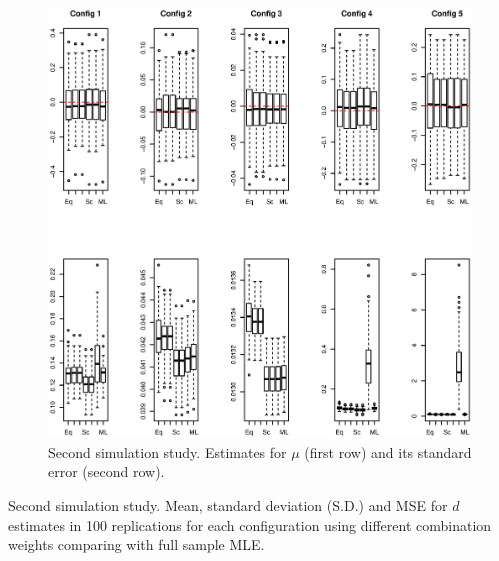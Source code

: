\documentclass[11pt,a5paper,twoside]{book}
\begin{document}
{\begin{figure}
\includegraphics[width=\textwidth]{fig_mu.eps}
\caption{\small \linespread{1.1}  Second simulation study. Estimates for $\mu$ (first row) and its standard error (second row).} \label{fig_mu}
\end{figure}




\begin{table}[ht]
\centering
\caption{\small \linespread{1.1} Second simulation study. Mean, standard deviation (S.D.) and MSE for $d$ estimates in 100 replications for each configuration using different combination weights comparing with full sample MLE.}
\label{tab_d_est}

\vspace*{2mm}


\end{table}}
\end{document}
